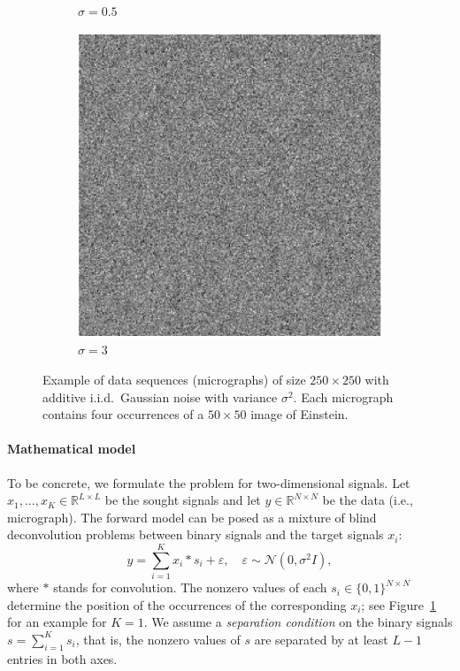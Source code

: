 \documentclass[english,11pt]{article}
\theoremstyle{plain}
\theoremstyle{definition}
\theoremstyle{remark}
\theoremstyle{plain}
\newcommand{\RNN}{\mathbb{R}^{N\times N}}
\newcommand{\RLL}{\mathbb{R}^{L\times L}}
\begin{document}
\begin{figure}[h!]
\begin{subfigure}[h]{0.33\textwidth}
		\caption{$\sigma = 0.5$}
	\end{subfigure}
	\begin{subfigure}[h]{0.33\textwidth}
		\centering
		\includegraphics[scale=0.5]{micrograph_Einstein_example_s3}
		\caption{$\sigma = 3$}
	\end{subfigure}
	\caption{\label{fig:micro_example} Example of data sequences (micrographs) of size $250\times 250$ with additive i.i.d.\ Gaussian noise with variance $\sigma^2$. Each micrograph contains four occurrences of a $50 \times 50$ image of Einstein.}	
\end{figure}


\paragraph{Mathematical model}

To be concrete, we formulate the problem for two-dimensional signals. 
Let $x_1,\ldots,x_K\in\RLL$ be the sought signals and let $y\in\RNN$ be the data (i.e., micrograph). 
The forward model can be posed as a mixture of {blind deconvolution} problems between binary signals and the target signals $x_i$:
\begin{equation} \label{eq:model}
y = \sum_{i=1}^K x_i\ast s_i + \varepsilon,\quad \varepsilon\sim\mathcal{N}(0,\sigma^2 I),
\end{equation}
where $\ast$ stands for convolution.
The nonzero values of each  $s_i\in\{0,1\}^{N\times N}$ determine the position of the occurrences of the corresponding $x_i$; see Figure~\ref{fig:micro_example} for an example for $K=1$. We assume a \emph{separation condition} on the binary signals $s=\sum_{i=1}^Ks_i$, that is, the nonzero values of $s$ are separated by at least $L-1$ entries in both axes.
\end{document}
